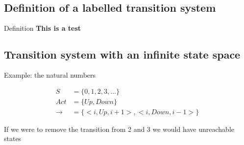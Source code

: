 \subsection{Definition of a labelled transition system}

Definition
\textbf{This is a test}


\subsection{Transition system with an infinite state space}

Example: the natural numbers

\begin{align*}
  S &= \{ 0, 1, 2, 3, ... \} \\
  Act &= \{ Up, Down \}  \\
  \rightarrow &= \{ <i, Up, i+1>, <i, Down, i-1> \}
\end{align*}

If we were to remove the transition from 2 and 3 we would have unreachable states


